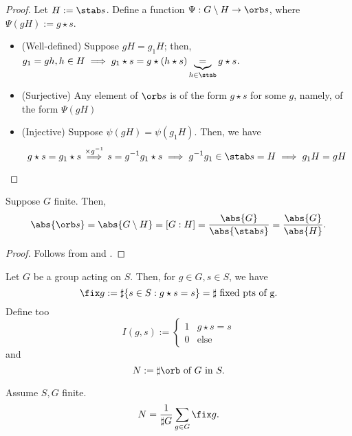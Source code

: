 \documentclass[12pt,oneside]{article}
\begin{document}
\begin{proof}
  Let $H := \stab s$. Define a function $\Psi : G \setminus H \to \orb s$, where $\Psi (gH) := g \star s$.
  \begin{itemize}
    \item (Well-defined) Suppose $gH = g_1 H$; then, $g_1 = gh, h \in H \implies g_1 \star s = g \star (h \star s) \underbrace{=}_{h \in \stab} g \star s$.
    \item (Surjective) Any element of $\orb s$ is of the form $g \star s$ for some $g$, namely, of the form $\Psi(gH)$
    \item (Injective) Suppose $\psi (gH) = \psi (g_1 H)$. Then, we have \[
    g \star s = g_1 \star s \overset{\times g^{-1}}\implies  s = g^{-1}g_1 \star s \implies g^{-1}g_1 \in \stab s = H \implies g_1 H = gH
    \]
  \end{itemize}
\end{proof}

\begin{corollary}
  Suppose $G$ finite. Then, \[
    \abs{\orb s} = \abs{G \setminus H} = [G : H]= \frac{\abs{G}}{\abs{\stab s}} = \frac{\abs{G}}{\abs{H}}.
    \]
\end{corollary}

\begin{proof}
  Follows from  and .
\end{proof}

\begin{definition}[Fix, I, N]
  Let $G$ be a group acting on $S$. Then, for $g \in G, s \in S$, we have \[
  \fix g := \sharp \{ s \in S : g \star s = s\} = \sharp \text{ fixed pts of g}.
  \]
  Define too \[
  I(g, s) := \begin{cases}
    1 & g \star s = s\\
    0 & \text{else}
  \end{cases}  
  \]
  and $$N := \sharp \orb \text{ of } G \text{ in } S.$$
\end{definition}

\begin{theorem}\label{thm:burnside}
  Assume $S, G$ finite.
  \[
  N = \frac{1}{\sharp G} \sum_{g \in G} \fix g.  
  \]
\end{theorem}
\end{document}
